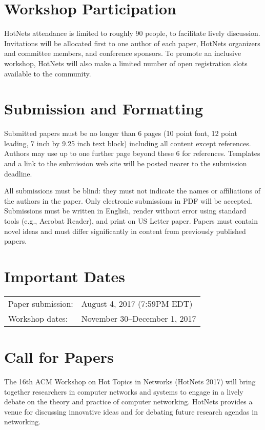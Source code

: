 \documentclass{hotnets17}
\begin{document}
\section{Workshop Participation}

HotNets attendance is limited to roughly 90 people, to facilitate
lively discussion. Invitations will be allocated first to one author
of each paper, HotNets organizers and committee members, and
conference sponsors. To promote an inclusive workshop, HotNets will
also make a limited number of open registration slots available to the
community.

\section{Submission and Formatting}

Submitted papers must be no longer than 6 pages (10 point font, 12
point leading, 7 inch by 9.25 inch text block) including all content
except references. Authors may use up to one further page beyond these
6 for references. Templates and a link to the submission web site will
be posted nearer to the submission deadline.

All submissions must be blind: they must not indicate the names or
affiliations of the authors in the paper. Only electronic submissions
in PDF will be accepted. Submissions must be written in English,
render without error using standard tools (e.g., Acrobat Reader), and
print on US Letter paper. Papers must contain novel ideas and must
differ significantly in content from previously published papers.

\section{Important Dates}

{
\small 
\begin{tabular}{ll}
Paper submission: 	        & August 4, 2017 (7:59PM EDT)\\
Workshop dates: 	        & November 30--December 1, 2017\\
\end{tabular}
}

\section{Call for Papers}

The 16th ACM Workshop on Hot Topics in Networks (HotNets 2017) will
bring together researchers in computer networks and systems to engage
in a lively debate on the theory and practice of computer
networking. HotNets provides a venue for discussing innovative ideas
and for debating future research agendas in networking.
\end{document}
